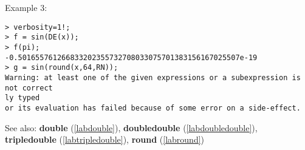 \noindent Example 3: 
\begin{center}\begin{minipage}{15cm}\begin{Verbatim}[frame=single]
> verbosity=1!;
> f = sin(DE(x));
> f(pi);
-0.501655761266833202355732708033075701383156167025507e-19
> g = sin(round(x,64,RN));
Warning: at least one of the given expressions or a subexpression is not correct
ly typed
or its evaluation has failed because of some error on a side-effect.
\end{Verbatim}
\end{minipage}\end{center}
See also: \textbf{double} (\ref{labdouble}), \textbf{doubledouble} (\ref{labdoubledouble}), \textbf{tripledouble} (\ref{labtripledouble}), \textbf{round} (\ref{labround})

